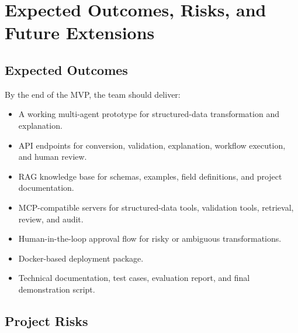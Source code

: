 \section{Expected Outcomes, Risks, and Future Extensions}

\subsection{Expected Outcomes}

By the end of the MVP, the team should deliver:

\begin{itemize}
  \item A working multi-agent prototype for structured-data transformation and explanation.
  \item API endpoints for conversion, validation, explanation, workflow execution, and human review.
  \item RAG knowledge base for schemas, examples, field definitions, and project documentation.
  \item MCP-compatible servers for structured-data tools, validation tools, retrieval, review, and audit.
  \item Human-in-the-loop approval flow for risky or ambiguous transformations.
  \item Docker-based deployment package.
  \item Technical documentation, test cases, evaluation report, and final demonstration script.
\end{itemize}

\subsection{Project Risks}

